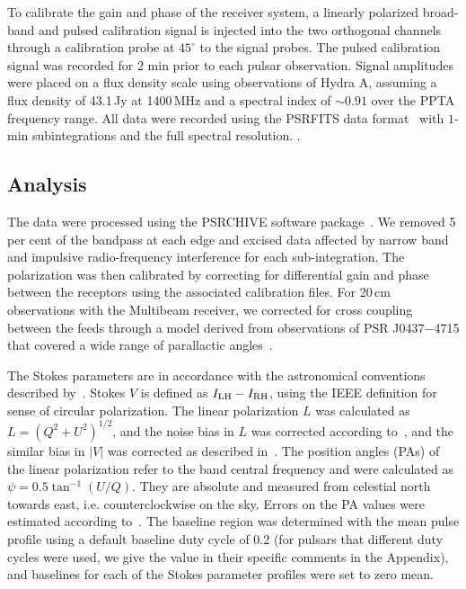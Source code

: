 \documentclass[useAMS,usenatbib]{mn2e}
\begin{document}
To calibrate the gain and phase of the receiver system, a linearly polarized 
broad-band and pulsed calibration signal is injected into the two orthogonal 
channels through a calibration probe at $45^{\circ}$ to the 
signal probes. The pulsed calibration signal was recorded for $2$ min prior to 
each pulsar observation.
%
Signal amplitudes were placed on a flux density scale using observations of 
Hydra A, assuming a flux density of 43.1\,Jy at 1400\,MHz and a spectral 
index of $\sim0.91$ over the PPTA frequency range.
%
All data were recorded using the PSRFITS data format~\citep{Hotan04} with 
$1$-min subintegrations and the full spectral resolution.
%
\citep[for futher details see][and references therein]{Manchester13}. 
%

%


\subsection{Analysis}

The data were processed using the PSRCHIVE software package~\citep{Hotan04}. 
We removed 5 per cent of the bandpass at each edge and excised data 
affected by narrow band and impulsive radio-frequency interference for each 
sub-integration.
%
The polarization was then calibrated by correcting for differential gain and 
phase between the receptors using the associated calibration files.
%
For 20\,cm observations with the Multibeam receiver, we corrected for 
cross coupling between the feeds through a model derived from observations of 
PSR J0437$-$4715 that covered a wide range of parallactic angles~\citep{VanStraten04}.
%

The Stokes parameters are in accordance with the astronomical conventions described 
by~\citet{vanStraten10}. Stokes $V$ is defined as $I_{\rm{LH}}-I_{\rm{RH}}$, 
using the IEEE definition for sense of circular polarization. 
%
The linear polarization $L$ was calculated as $L=(Q^2+U^2)^{1/2}$, and the 
noise bias in $L$ was corrected according to~\citet{Lorimer05}, and the similar 
bias in $|V|$ was corrected as described in~\citet{Yan11}.
%
The position angles (PAs) of the linear polarization refer to the band central 
frequency and were calculated as $\psi=0.5\tan^{-1}(U/Q)$. They are absolute and 
measured from celestial north towards east, i.e. counterclockwise on the sky.
%
Errors on the PA values were estimated according to~\citet{Everett01}.
%
The baseline region was determined with the mean pulse profile using a default 
baseline duty cycle of 0.2 (for pulsars that different duty cycles were used, 
we give the value in their specific comments in the Appendix), and baselines for 
each of the Stokes parameter profiles were set to zero mean.
%
\end{document}
